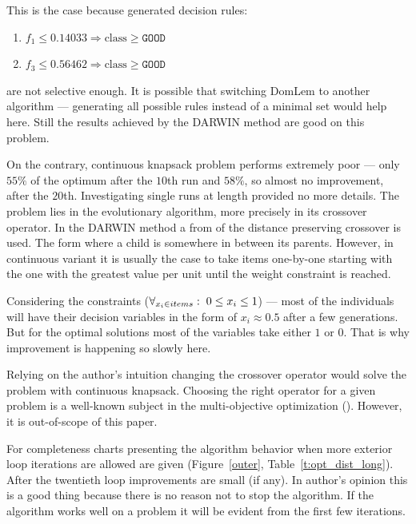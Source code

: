 This is the case because generated decision rules:
\begin{enumerate}
\item $f_1 \le 0.14033 \Rightarrow \text{class} \ge \texttt{GOOD}$
\item $f_3 \le 0.56462 \Rightarrow \text{class} \ge \texttt{GOOD}$
\end{enumerate}
are not selective enough. It is possible that switching DomLem to another
algorithm --- generating all possible rules instead of a minimal set would
help here. Still the results achieved by the DARWIN method are good on this
problem.

On the contrary, continuous knapsack problem performs extremely poor --- only
$55\%$ of the optimum after the $10$th run and $58\%$, so almost no
improvement, after the $20$th. Investigating single runs at length provided no
more details. The problem lies in the evolutionary algorithm, more precisely
in its crossover operator. In the DARWIN method a from of the distance
preserving crossover is used. The form where a child is somewhere in between
its parents. However, in continuous variant it is usually the case to take
items one-by-one starting with the one with the greatest value per unit until
the weight constraint is reached.

Considering the constraints ($ \forall_{x_i \in items}: \hspace{0.1cm} 0 \leq
x_i \leq 1 $) --- most of the individuals will have their decision variables
in the form of $x_i \approx 0.5$ after a few generations. But for the optimal
solutions most of the variables take either $1$ or $0$. That is why
improvement is happening so slowly here.

Relying on the author's intuition changing the crossover operator would solve
the problem with continuous knapsack. Choosing the right operator for a given
problem is a well-known subject in the multi-objective optimization
(\cite{Deb08}). However, it is out-of-scope of this paper.

For completeness charts presenting the algorithm behavior when more exterior
loop iterations are allowed are given (Figure~\ref{outer},
Table~\ref{t:opt_dist_long}). After the twentieth loop improvements are small
(if any). In author's opinion this is a good thing because there is no reason
not to stop the algorithm. If the algorithm works well on a problem it will be
evident from the first few iterations.

